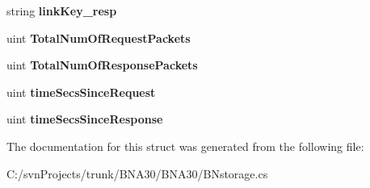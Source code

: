 \begin{DoxyCompactItemize}
string {\bfseries link\+Key\+\_\+resp}
\item 
\mbox{\label{struct_b_n_a30_1_1_b_nstorage_1_1_link_stats_a199305dca4452f4f6b8f489ae71cfeef}} 
uint {\bfseries Total\+Num\+Of\+Request\+Packets}
\item 
\mbox{\label{struct_b_n_a30_1_1_b_nstorage_1_1_link_stats_a8d25c27b870a8bdd6de902a3a3169224}} 
uint {\bfseries Total\+Num\+Of\+Response\+Packets}
\item 
\mbox{\label{struct_b_n_a30_1_1_b_nstorage_1_1_link_stats_a5a48c62dbca46c90f33dce025d4d7d9a}} 
uint {\bfseries time\+Secs\+Since\+Request}
\item 
\mbox{\label{struct_b_n_a30_1_1_b_nstorage_1_1_link_stats_a6233a8524b8067471d210c17ba5efb62}} 
uint {\bfseries time\+Secs\+Since\+Response}
\end{DoxyCompactItemize}


The documentation for this struct was generated from the following file\+:\begin{DoxyCompactItemize}
\item 
C\+:/svn\+Projects/trunk/\+B\+N\+A30/\+B\+N\+A30/B\+Nstorage.\+cs\end{DoxyCompactItemize}

